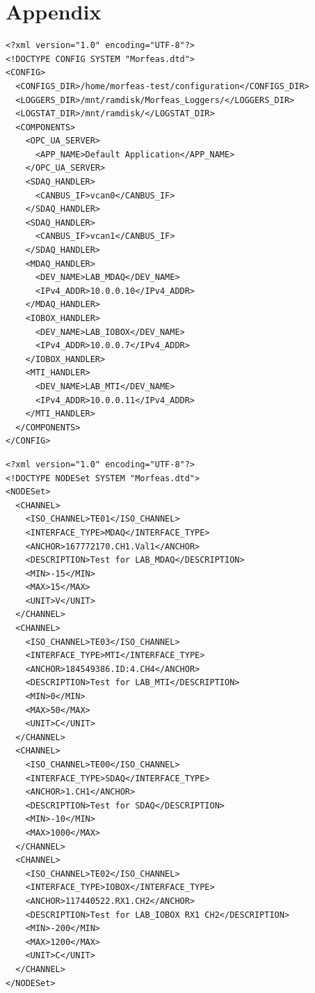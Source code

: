 \documentclass{article}
\begin{document}
\section{Appendix}
\begin{lstlisting}[frame=single,caption=Example of Morfeas\_config.xml,label=lst:Morfeas_config.xml]
<?xml version="1.0" encoding="UTF-8"?>
<!DOCTYPE CONFIG SYSTEM "Morfeas.dtd">
<CONFIG>
  <CONFIGS_DIR>/home/morfeas-test/configuration</CONFIGS_DIR>
  <LOGGERS_DIR>/mnt/ramdisk/Morfeas_Loggers/</LOGGERS_DIR>
  <LOGSTAT_DIR>/mnt/ramdisk/</LOGSTAT_DIR>
  <COMPONENTS>
    <OPC_UA_SERVER>
      <APP_NAME>Default Application</APP_NAME>
    </OPC_UA_SERVER>
    <SDAQ_HANDLER>
      <CANBUS_IF>vcan0</CANBUS_IF>
    </SDAQ_HANDLER>
    <SDAQ_HANDLER>
      <CANBUS_IF>vcan1</CANBUS_IF>
    </SDAQ_HANDLER>
    <MDAQ_HANDLER>
      <DEV_NAME>LAB_MDAQ</DEV_NAME>
      <IPv4_ADDR>10.0.0.10</IPv4_ADDR>
    </MDAQ_HANDLER>
    <IOBOX_HANDLER>
      <DEV_NAME>LAB_IOBOX</DEV_NAME>
      <IPv4_ADDR>10.0.0.7</IPv4_ADDR>
    </IOBOX_HANDLER>
    <MTI_HANDLER>
      <DEV_NAME>LAB_MTI</DEV_NAME>
      <IPv4_ADDR>10.0.0.11</IPv4_ADDR>
    </MTI_HANDLER>
  </COMPONENTS>
</CONFIG>
\end{lstlisting}
\newpage
\begin{lstlisting}[frame=single,caption=Example of OPC\_UA\_Config.xml,label=lst:OPC_UA_Config.xml]
<?xml version="1.0" encoding="UTF-8"?>
<!DOCTYPE NODESet SYSTEM "Morfeas.dtd">
<NODESet>
  <CHANNEL>
    <ISO_CHANNEL>TE01</ISO_CHANNEL>
    <INTERFACE_TYPE>MDAQ</INTERFACE_TYPE>
    <ANCHOR>167772170.CH1.Val1</ANCHOR>
    <DESCRIPTION>Test for LAB_MDAQ</DESCRIPTION>
    <MIN>-15</MIN>
    <MAX>15</MAX>
    <UNIT>V</UNIT>
  </CHANNEL>
  <CHANNEL>
    <ISO_CHANNEL>TE03</ISO_CHANNEL>
    <INTERFACE_TYPE>MTI</INTERFACE_TYPE>
    <ANCHOR>184549386.ID:4.CH4</ANCHOR>
    <DESCRIPTION>Test for LAB_MTI</DESCRIPTION>
    <MIN>0</MIN>
    <MAX>50</MAX>
    <UNIT>C</UNIT>
  </CHANNEL>
  <CHANNEL>
    <ISO_CHANNEL>TE00</ISO_CHANNEL>
    <INTERFACE_TYPE>SDAQ</INTERFACE_TYPE>
    <ANCHOR>1.CH1</ANCHOR>
    <DESCRIPTION>Test for SDAQ</DESCRIPTION>
    <MIN>-10</MIN>
    <MAX>1000</MAX>
  </CHANNEL>
  <CHANNEL>
    <ISO_CHANNEL>TE02</ISO_CHANNEL>
    <INTERFACE_TYPE>IOBOX</INTERFACE_TYPE>
    <ANCHOR>117440522.RX1.CH2</ANCHOR>
    <DESCRIPTION>Test for LAB_IOBOX RX1 CH2</DESCRIPTION>
    <MIN>-200</MIN>
    <MAX>1200</MAX>
    <UNIT>C</UNIT>
  </CHANNEL>
</NODESet>
\end{lstlisting}
\newpage
\begin{tree_box}[label=tree:OPC_UA_nodeset, title=Morfeas OPC-UA Nodeset]
\end{tree_box}
\end{document}
